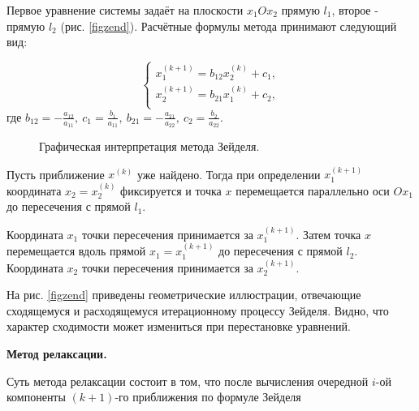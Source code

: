\documentclass[12pt, a4paper]{article}
\begin{document}
\begin{enumerate}
Первое уравнение системы задаёт на плоскости $x_{1}Ox_{2}$ прямую $l_{1}$, второе - прямую $l_{2}$ (рис. \eqref{figzend}). Расчётные формулы метода принимают следующий вид:

\begin{equation*}
\begin{cases}
x_{1}^{(k+1)}=b_{12}x_{2}^{(k)}+c_{1},\\
x_{2}^{(k+1)}=b_{21}x_{1}^{(k)}+c_{2},\\
\end{cases}
\end{equation*}
где $b_{12}=-\frac{a_{12}}{a_{11}},~ c_{1}=\frac{b_{1}}{a_{11}},~ b_{21}=-\frac{a_{21}}{a_{22}},~ c_{2}=\frac{b_{2}}{a_{22}}.$
\begin{figure}[h]
\caption{Графическая интерпретация метода Зейделя.}
\label{figzend}
\end{figure}

Пусть приближение $x^{(k)}$ уже найдено. Тогда при определении $x_{1}^{(k+1)}$ координата $x_{2}=x_{2}^{(k)}$ фиксируется и точка $x$ перемещается параллельно оси $Ox_{1}$ до пересечения с прямой $l_{1}$.

Координата $x_{1}$ точки пересечения принимается за $x_{1}^{(k+1)}$. Затем точка $x$ перемещается вдоль прямой $x_{1}=x_{1}^{(k+1)}$ до пересечения с прямой $l_{2}$. Координата $x_{2}$ точки пересечения принимается за $x_{2}^{(k+1)}$.

На рис. \eqref {figzend} приведены геометрические иллюстрации, отвечающие сходящемуся и расходящемуся итерационному процессу Зейделя. Видно, что характер сходимости может измениться при перестановке уравнений.

\textbf{Метод релаксации.}

Суть метода релаксации состоит в том, что после вычисления очередной $i$-ой компоненты $(k+1)$-го приближения по формуле Зейделя


\end{enumerate}
\end{document}
